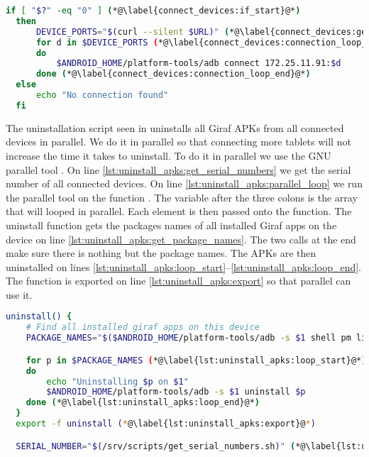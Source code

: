 \begin{description}
\begin{lstlisting}[language=bash,caption=Script that connects to devices,label=lst:connect_devices]
  if [ "$?" -eq "0" ] (*@\label{connect_devices:if_start}@*)
  then
      DEVICE_PORTS="$(curl --silent $URL)" (*@\label{connect_devices:get_ports}@*)
      for d in $DEVICE_PORTS (*@\label{connect_devices:connection_loop_start}@*)
      do
          $ANDROID_HOME/platform-tools/adb connect 172.25.11.91:$d
      done (*@\label{connect_devices:connection_loop_end}@*)
  else
      echo "No connection found"
  fi
  \end{lstlisting}
  \item[Uninstallation Script] The uninstallation script seen in  uninstalls all Giraf APKs from all connected devices in parallel. We do it in parallel so that connecting more tablets will not increase the time it takes to uninstall. To do it in parallel we use the GNU parallel tool \parencite{Tange2011a}. On line \ref{lst:uninstall_apks:get_serial_numbers} we get the serial number of all connected devices. On line \ref{lst:uninstall_apks:parallel_loop} we run the parallel tool on the function . The variable  after the three colons is the array that will looped in parallel. Each element is then passed onto the  function. The uninstall function gets the packages names of all installed Giraf apps on the device on line \ref{lst:uninstall_apks:get_package_names}. The two  calls at the end make sure there is nothing but the package names. The APKs are then uninstalled on lines \ref{lst:uninstall_apks:loop_start}--\ref{lst:uninstall_apks:loop_end}. The function is exported on line \ref{lst:uninstall_apks:export} so that parallel can use it.
  \begin{lstlisting}[language=bash,caption=Script that uninstalls all installed Giraf apps on all devices,label=lst:uninstall_apks]
  uninstall() {
    # Find all installed giraf apps on this device
    PACKAGE_NAMES="$($ANDROID_HOME/platform-tools/adb -s $1 shell pm list packages -f | grep dk.aau.cs.giraf | sed 's/.*apk=//' | sed 's/\s*//g')" (*@\label{lst:uninstall_apks:get_package_names}@*)

    for p in $PACKAGE_NAMES (*@\label{lst:uninstall_apks:loop_start}@*)
    do
        echo "Uninstalling $p on $1"
        $ANDROID_HOME/platform-tools/adb -s $1 uninstall $p
    done (*@\label{lst:uninstall_apks:loop_end}@*)
  }
  export -f uninstall (*@\label{lst:uninstall_apks:export}@*)

  SERIAL_NUMBER="$(/srv/scripts/get_serial_numbers.sh)" (*@\label{lst:uninstall_apks:get_serial_numbers}@*)


\end{lstlisting}
\end{description}
